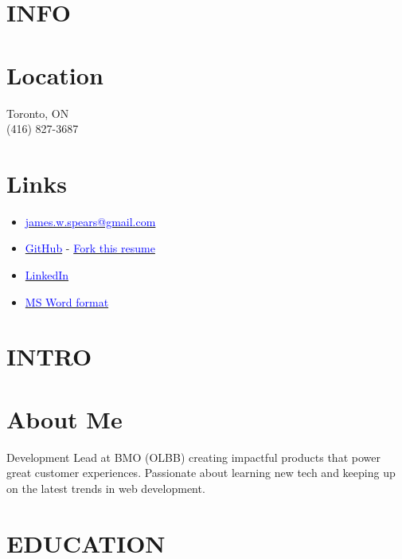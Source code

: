 \documentclass[margin]{res}
\begin{document}
\name{\textcolor{NavyBlue}{James Spears} \textcolor{black}{\bf Development Lead - Commercial Banking - BMO} }

\begin{resume}

	\section{\textcolor{NavyBlue}{INFO}}

	\normalsize{\section{Location}}
	{Toronto, ON \\ (416) 827-3687}

	\normalsize{\section{Links}}
	\begin{itemize}
		\item \href{mailto:james.w.spears@gmail.com}{\textcolor{blue}{james.w.spears@gmail.com}}
		\item \href{https://github.com/james-spears}{\textcolor{blue}{GitHub}} - \href{https://github.com/james-spears/resume}{\textcolor{blue}{Fork this resume}}
		\item \href{https://www.linkedin.com/in/james-spears-50834b8a/}{\textcolor{blue}{LinkedIn}}
		\item \href{https://s3.amazonaws.com/james-spears.com/resume.docx}{\textcolor{blue}{MS Word format}}
	\end{itemize}

	\section{\textcolor{NavyBlue}{INTRO}}

	\normalsize{\section{About Me}}
	Development Lead at BMO (OLBB) creating impactful products that power great customer experiences.
	Passionate about learning new tech and keeping up on the latest trends in web development.
	\section{\textcolor{NavyBlue}{EDUCATION}}


\end{resume}
\end{document}
